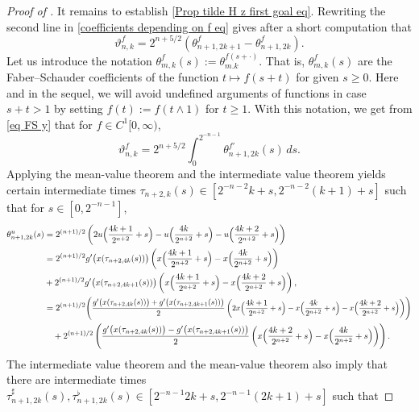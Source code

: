\documentclass[10pt,a4paper]{amsart}
\newcommand\scalemath[2]{\scalebox{#1}{\mbox{\ensuremath{\displaystyle #2}}}}
\begin{document}
\begin{proof}[Proof of ]
	It remains to establish \eqref{Prop tilde H z first goal eq}. 
	Rewriting the second line in \eqref{coefficients depending on f eq}
	gives after a short computation that 
	\begin{equation}\label{eq FS y}
		\vartheta^f_{n,k} =   2^{n+5/2}\left(\theta^f_{n+1,2k+1}-\theta^f_{n+1,2k}\right).	\end{equation}
	Let us  introduce the notation $\theta_{m,k}^f(s):=\theta_{m.k}^{f(s+\cdot)}$. That is, $\theta_{m,k}^f(s)$ are the Faber--Schauder coefficients of the function $t\mapsto f(s+t)$ for given $s\ge0$. Here and in the sequel, we will avoid undefined arguments of functions in case $s+t>1$ by setting $f(t):= f(t \wedge 1)$ for $t \ge 1$. With this notation, 
	we get from \eqref{eq FS y} that for $f\in C^1[0,\infty)$,		\begin{equation}\label{eq zeta v}
		\vartheta^f_{n,k} = 2^{n+5/2}\int_{0}^{2^{-n-1}}\theta^{f'}_{n+1,2k}(s)\,ds .
	\end{equation}
	Applying the mean-value theorem and the intermediate value theorem yields certain intermediate times $\tau_{n+2,k}(s) \in [2^{-n-2}k+s, 2^{-n-2}(k+1)+s]$ such  that for $s \in [0,2^{-n-1}]$, 
	\begin{equation*}
		\begin{split}
			\theta^{u}_{n+1,2k}(s) &= 2^{(n+1)/2}\left(2u\Big(\frac{4k+1}{2^{n+2}}+s\Big)-u\Big(\frac{4k}{2^{n+2}}+s\Big)-u\Big(\frac{4k+2}{2^{n+2}}+s\Big)\right)\\&= 2^{(n+1)/2} g'\big(x(\tau_{n+2,4k}(s))\big)\left(x\Big(\frac{4k+1}{2^{n+2}}+s\Big)-x\Big(\frac{4k}{2^{n+2}}+s\Big)\right) \\
			&+2^{(n+1)/2} g'\big(x(\tau_{n+2,4k+1}(s))\big)\left(x\Big(\frac{4k+1}{2^{n+2}}+s\Big)-x\Big(\frac{4k+2}{2^{n+2}}+s\Big)\right),\\
			&=2^{(n+1)/2}\scalemath{0.9}{\left(\frac{g'\big(x(\tau_{n+2,4k}(s))\big)+g'\big(x(\tau_{n+2,4k+1}(s))\big)}{2}\left(2x\Big(\frac{4k+1}{2^{n+2}}+s\Big)-x\Big(\frac{4k}{2^{n+2}}+s\Big)-x\Big(\frac{4k+2}{2^{n+2}}+s\Big)\right)\right)}\\&\quad+ 2^{(n+1)/2}\left(\frac{g'\big(x(\tau_{n+2,4k}(s))\big)-g'\big(x(\tau_{n+2,4k+1}(s))\big)}{2}\left(x\Big(\frac{4k+2}{2^{n+2}}+s\Big)-x\Big(\frac{4k}{2^{n+2}}+s\Big)\right)\right).
		\end{split}
	\end{equation*}
	The intermediate value theorem  and the mean-value theorem  also imply that there are intermediate times $\tau^\sharp_{n+1,2k}(s),\tau^\flat_{n+1,2k}(s) \in [2^{-n-1}2k+s,2^{-n-1}(2k+1)+s]$ such that 

\end{proof}
\end{document}
